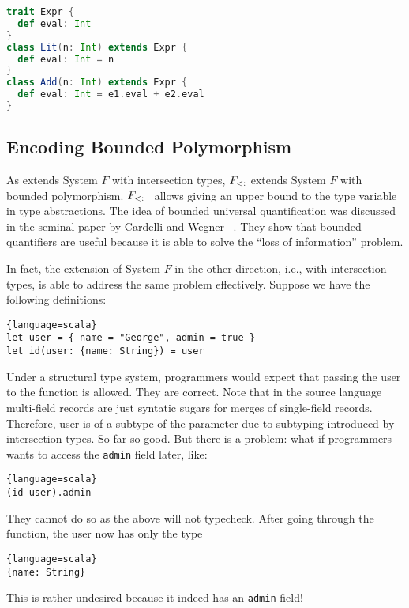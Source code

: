 
\begin{lstlisting}[language=scala]
trait Expr {
  def eval: Int
}
class Lit(n: Int) extends Expr {
  def eval: Int = n
}
class Add(n: Int) extends Expr {
  def eval: Int = e1.eval + e2.eval
}
\end{lstlisting}


\subsection{Encoding Bounded Polymorphism}

As \name extends System $ F $ with intersection types, $ F_{<:} $ extends
System $ F $ with bounded polymorphism. $ F_{<:} $~\cite{pierce2002types}
allows giving an upper bound to the type variable in type abstractions. The idea
of bounded universal quantification was discussed in the seminal paper by
Cardelli and Wegner ~\cite{cardelli1985understanding}. They show that bounded
quantifiers are useful because it is able to solve the ``loss of information''
problem.

In fact, the extension of System $ F $ in the other direction, i.e., with
intersection types, is able to address the same problem effectively. Suppose we
have the following definitions:
\begin{lstlisting}{language=scala}
let user = { name = "George", admin = true }
let id(user: {name: String}) = user
\end{lstlisting}
Under a structural type system, programmers would expect that passing the user
to the function is allowed. They are correct. Note that in the source language
multi-field records are just syntatic sugars for merges of single-field records.
Therefore, user is of a subtype of the parameter due to subtyping introduced by
intersection types. So far so good. But there is a problem: what if programmers
wants to access the \texttt{admin} field later, like:
\begin{lstlisting}{language=scala}
(id user).admin
\end{lstlisting}
They cannot do so as the above will not typecheck. After going through the
function, the user now has only the type
\begin{lstlisting}{language=scala}
{name: String}
\end{lstlisting}
This is rather undesired because it indeed has an \texttt{admin} field!

